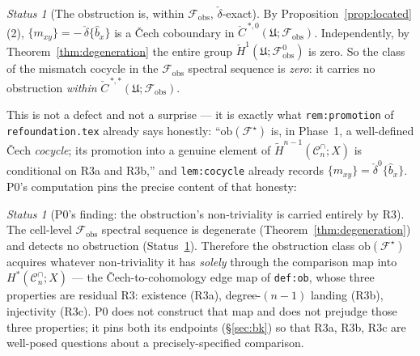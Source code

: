 \documentclass[11pt,oneside]{amsart}
\theoremstyle{plain}
\theoremstyle{definition}
\theoremstyle{remark}
\theoremstyle{honeststyle}
\newtheorem{status}[theorem]{Status}
\newcommand{\F}{\mathcal{F}}
\newcommand{\Fstar}{\F^{\star}}
\newcommand{\Cn}{\mathcal{C}^{\cap}_n}
\newcommand{\ob}{\mathrm{ob}}
\newcommand{\fobs}{\mathcal{F}_{\mathrm{obs}}}
\newcommand{\Uf}{\mathfrak{U}}
\newcommand{\Ccheck}{\check{C}}
\begin{document}
\begin{status}[The obstruction is, within $\fobs$, $\check\delta$-exact]
\label{status:exact}
By Proposition~\ref{prop:located}(2), $\{m_{xy}\}=-\,\check\delta
\{\widehat b_{x}\}$ is a \v{C}ech coboundary in
$\Ccheck^{\,*,0}(\Uf;\fobs)$.
Independently, by Theorem~\ref{thm:degeneration} the entire group
$\check H^{1}(\Uf;\fobs^{0})$ is zero. So the class of the mismatch
cocycle in the $\fobs$ spectral sequence is \emph{zero}: it carries
no obstruction \emph{within} $\Ccheck^{\,*,*}(\Uf;\fobs)$.
\end{status}

This is not a defect and not a surprise --- it is exactly what
\texttt{rem:promotion} of \texttt{refoundation.tex} already says
honestly: ``$\ob(\Fstar)$ is, in Phase~1, a well-defined \v{C}ech
\emph{cocycle}; its promotion into a genuine element of
$\widetilde H^{n-1}(\Cn;X)$ is conditional on R3a and R3b,'' and
\texttt{lem:cocycle} already records $\{m_{xy}\}=\check\delta^{0}
\{\widehat b_{x}\}$. P0's computation pins the precise content of that
honesty:

\begin{status}[P0's finding: the obstruction's non-triviality is
carried entirely by R3]
\label{status:finding}
The cell-level $\fobs$ spectral sequence is degenerate
(Theorem~\ref{thm:degeneration}) and detects no obstruction
(Status~\ref{status:exact}). Therefore the obstruction class
$\ob(\Fstar)$ acquires whatever non-triviality it has \emph{solely}
through the comparison map into $H^{*}(\Cn;X)$ --- the
\v{C}ech-to-cohomology edge map of \texttt{def:ob}, whose three
properties are residual R3: existence (R3a), degree-$(n-1)$ landing
(R3b), injectivity (R3c). P0 does not construct that map and does not
prejudge those three properties; it pins both its endpoints
(\S\ref{sec:bk}) so that R3a, R3b, R3c are well-posed questions about
a precisely-specified comparison.
\end{status}
\end{document}
